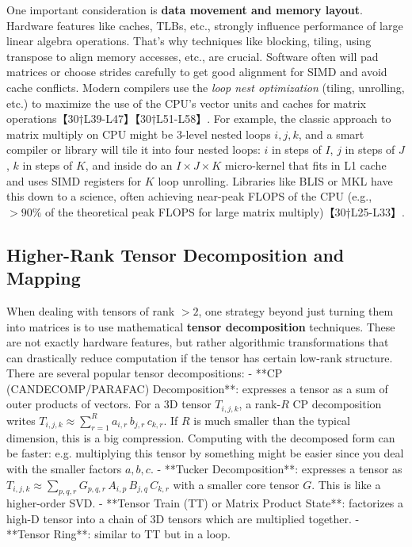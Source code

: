 One important consideration is \textbf{data movement and memory layout}. Hardware features like caches, TLBs, etc., strongly influence performance of large linear algebra operations. That’s why techniques like blocking, tiling, using transpose to align memory accesses, etc., are crucial. Software often will pad matrices or choose strides carefully to get good alignment for SIMD and avoid cache conflicts. Modern compilers use the \textit{loop nest optimization} (tiling, unrolling, etc.) to maximize the use of the CPU’s vector units and caches for matrix operations【30†L39-L47】【30†L51-L58】. For example, the classic approach to matrix multiply on CPU might be 3-level nested loops $i,j,k$, and a smart compiler or library will tile it into four nested loops: $i$ in steps of $I$, $j$ in steps of $J$, $k$ in steps of $K$, and inside do an $I\times J \times K$ micro-kernel that fits in L1 cache and uses SIMD registers for $K$ loop unrolling. Libraries like BLIS or MKL have this down to a science, often achieving near-peak FLOPS of the CPU (e.g., $>90\%$ of the theoretical peak FLOPS for large matrix multiply)【30†L25-L33】.

\subsection{Higher-Rank Tensor Decomposition and Mapping}  
When dealing with tensors of rank $>2$, one strategy beyond just turning them into matrices is to use mathematical \textbf{tensor decomposition} techniques. These are not exactly hardware features, but rather algorithmic transformations that can drastically reduce computation if the tensor has certain low-rank structure. There are several popular tensor decompositions: 
- **CP (CANDECOMP/PARAFAC) Decomposition**: expresses a tensor as a sum of outer products of vectors. For a 3D tensor $T_{i,j,k}$, a rank-$R$ CP decomposition writes $T_{i,j,k} \approx \sum_{r=1}^R a_{i,r}\,b_{j,r}\,c_{k,r}$. If $R$ is much smaller than the typical dimension, this is a big compression. Computing with the decomposed form can be faster: e.g. multiplying this tensor by something might be easier since you deal with the smaller factors $a, b, c$.
- **Tucker Decomposition**: expresses a tensor as $T_{i,j,k} \approx \sum_{p,q,r} G_{p,q,r}\, A_{i,p}\, B_{j,q}\, C_{k,r}$ with a smaller core tensor $G$. This is like a higher-order SVD.
- **Tensor Train (TT) or Matrix Product State**: factorizes a high-D tensor into a chain of 3D tensors which are multiplied together.
- **Tensor Ring**: similar to TT but in a loop.

